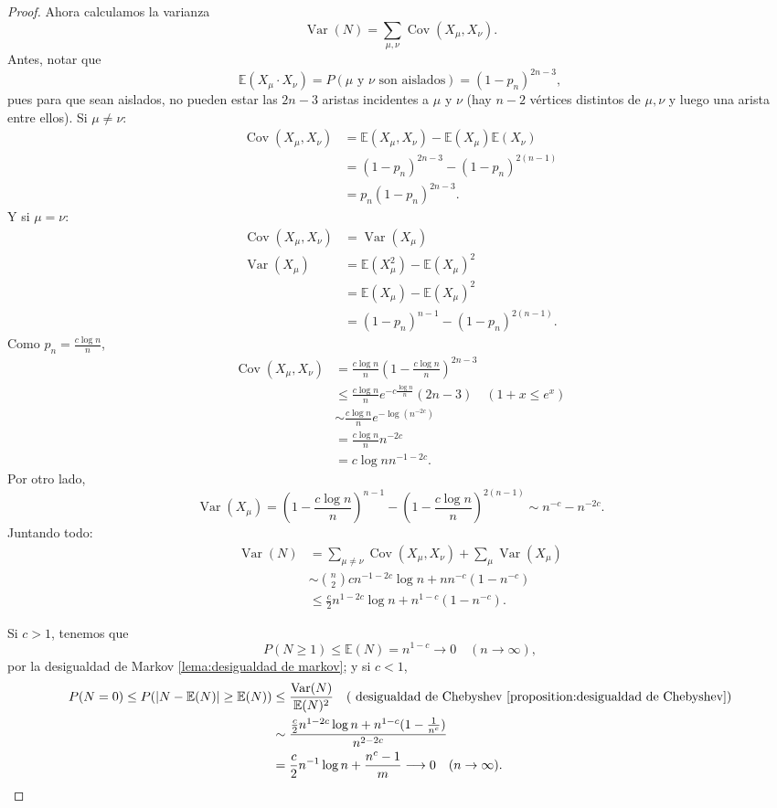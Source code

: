 \documentclass[12pt]{report}
\theoremstyle{plain}
\theoremstyle{definition}
\newcommand{\abs}[1]{\left \vert #1 \right \vert}
\begin{document}
\begin{proof}
Ahora calculamos la varianza
\[
    \operatorname{Var} (N) = \sum_{\mu, \nu} \operatorname{Cov} (X_\mu, X_\nu).
\]
Antes, notar que
\[
    \mathbb{E} (X_\mu \cdot X_\nu) = P (\mu \text{ y } \nu \text{ son aislados}) = (1-p_n)^{2n-3},
\]
pues para que sean aislados, no pueden estar las $2n-3$ aristas incidentes a $\mu$ y $\nu$ (hay $n-2$ vértices distintos de $\mu, \nu$ y luego una arista entre ellos). Si $\mu \neq \nu$:
\begin{align*}
\operatorname{Cov} (X_\mu, X_\nu) &= \mathbb{E} (X_\mu, X_\nu) - \mathbb{E} (X_\mu) \mathbb{E} (X_\nu) \\
&= (1-p_n)^{2n-3} - (1-p_n)^{2(n-1)} \\
&= p_n (1-p_n)^{2n-3}.
\end{align*}
Y si $\mu = \nu$:
\begin{align*}
\operatorname{Cov} (X_\mu , X_\nu) &= \operatorname{Var} (X_\mu) \\
\operatorname{Var} (X_\mu) &= \mathbb{E} (X_\mu^2) - \mathbb{E}(X_\mu)^2\\
&= \mathbb{E} (X_\mu) - \mathbb{E} (X_\mu)^2 \\
&= (1-p_n)^{n-1} - (1-p_n)^{2(n-1)}.
\end{align*}
Como $p_n = \frac{c \log n}{n}$,
\begin{align*}
\operatorname{Cov} (X_\mu, X_\nu) &= \frac{c \log n}{n} (1 - \frac{c \log n}{n} )^{2n - 3 } \\
&\leq \frac{c \log n}{n} e^{-c \frac{\log n}{n}} (2n-3) \quad (1 + x \leq e^x) \\
&\sim \frac{c \log n}{n} e^{- \log (n^{-2c})} \\
&= \frac{c\log n}{n} n^{-2 c} \\
&= c \log n n^{-1 - 2 c}.
\end{align*}
Por otro lado,
\[
    \operatorname{Var} (X_\mu) = (1- \frac{c\log n}{n})^{n-1} - (1- \frac{c \log n }{n})^{2(n-1)} \sim n^{-c} - n^{-2c}.
\]
Juntando todo:
\begin{align*}
\operatorname{Var} (N) &= \sum_{\mu \neq \nu} \operatorname{Cov} (X_\mu, X_\nu) + \sum_{\mu} \operatorname{Var} (X_\mu) \\
&\sim \binom n 2 cn^{-1 -2 c} \log n + n n^{-c} (1- n^{-c}) \\
&\leq \frac c 2 n^{1-2c} \log n + n^{1-c} (1-n^{-c}).
\end{align*}

Si $c > 1$, tenemos que
\[
    P (N \geq 1) \leq \mathbb{E} (N) = n^{1-c} \longrightarrow 0 \quad (n \to \infty),
\]
por la desigualdad de Markov \ref{lema:desigualdad de markov}; y si $c < 1$,
\begin{align*}
P(N = 0) \leq P(\abs{N - \mathbb{E} (N)} \geq \mathbb{E} (N)) &\leq \frac{\operatorname{Var} (N)}{\mathbb{E} (N)^2} \quad (\text{ desigualdad de Chebyshev \ref{proposition:desigualdad de Chebyshev}}) \\
&\sim \frac{\frac c 2 n^{1-2c} \log n + n^{1-c} (1- \frac 1 {n^c})}{n^{2-2c}} \\
&= \frac{c}{2} n^{-1} \log n + \frac {n^c - 1}{m} \longrightarrow 0 \quad (n \to \infty).
\end{align*}


\end{proof}
\end{document}
